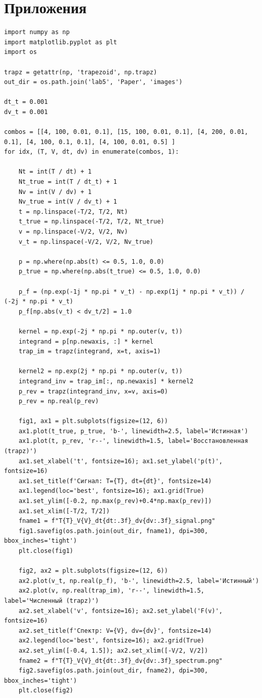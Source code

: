 \documentclass[a4paper, 12pt]{article}
\begin{document}
\section{Приложения}
\begin{lstlisting}[caption={Код для численного интегрирования в первом пункте}]
import numpy as np
import matplotlib.pyplot as plt
import os

trapz = getattr(np, 'trapezoid', np.trapz)
out_dir = os.path.join('lab5', 'Paper', 'images')

dt_t = 0.001
dv_t = 0.001

combos = [[4, 100, 0.01, 0.1], [15, 100, 0.01, 0.1], [4, 200, 0.01, 0.1], [4, 100, 0.1, 0.1], [4, 100, 0.01, 0.5] ]
for idx, (T, V, dt, dv) in enumerate(combos, 1):

    Nt = int(T / dt) + 1
    Nt_true = int(T / dt_t) + 1
    Nv = int(V / dv) + 1
    Nv_true = int(V / dv_t) + 1
    t = np.linspace(-T/2, T/2, Nt)
    t_true = np.linspace(-T/2, T/2, Nt_true)
    v = np.linspace(-V/2, V/2, Nv)
    v_t = np.linspace(-V/2, V/2, Nv_true)

    p = np.where(np.abs(t) <= 0.5, 1.0, 0.0)
    p_true = np.where(np.abs(t_true) <= 0.5, 1.0, 0.0)

    p_f = (np.exp(-1j * np.pi * v_t) - np.exp(1j * np.pi * v_t)) / (-2j * np.pi * v_t)
    p_f[np.abs(v_t) < dv_t/2] = 1.0

    kernel = np.exp(-2j * np.pi * np.outer(v, t))
    integrand = p[np.newaxis, :] * kernel
    trap_im = trapz(integrand, x=t, axis=1)

    kernel2 = np.exp(2j * np.pi * np.outer(v, t))
    integrand_inv = trap_im[:, np.newaxis] * kernel2
    p_rev = trapz(integrand_inv, x=v, axis=0)
    p_rev = np.real(p_rev)

    fig1, ax1 = plt.subplots(figsize=(12, 6))
    ax1.plot(t_true, p_true, 'b-', linewidth=2.5, label='Истинная')
    ax1.plot(t, p_rev, 'r--', linewidth=1.5, label='Восстановленная (trapz)')
    ax1.set_xlabel('t', fontsize=16); ax1.set_ylabel('p(t)', fontsize=16)
    ax1.set_title(f'Сигнал: T={T}, dt={dt}', fontsize=14)
    ax1.legend(loc='best', fontsize=16); ax1.grid(True)
    ax1.set_ylim([-0.2, np.max(p_rev)+0.4*np.max(p_rev)])  
    ax1.set_xlim([-T/2, T/2])
    fname1 = f"T{T}_V{V}_dt{dt:.3f}_dv{dv:.3f}_signal.png"
    fig1.savefig(os.path.join(out_dir, fname1), dpi=300, bbox_inches='tight')
    plt.close(fig1)

    fig2, ax2 = plt.subplots(figsize=(12, 6))
    ax2.plot(v_t, np.real(p_f), 'b-', linewidth=2.5, label='Истинный')
    ax2.plot(v, np.real(trap_im), 'r--', linewidth=1.5, label='Численный (trapz)')
    ax2.set_xlabel('v', fontsize=16); ax2.set_ylabel('F(v)', fontsize=16)
    ax2.set_title(f'Спектр: V={V}, dv={dv}', fontsize=14)
    ax2.legend(loc='best', fontsize=16); ax2.grid(True)
    ax2.set_ylim([-0.4, 1.5]); ax2.set_xlim([-V/2, V/2])
    fname2 = f"T{T}_V{V}_dt{dt:.3f}_dv{dv:.3f}_spectrum.png"
    fig2.savefig(os.path.join(out_dir, fname2), dpi=300, bbox_inches='tight')
    plt.close(fig2)

\end{lstlisting}
\end{document}
